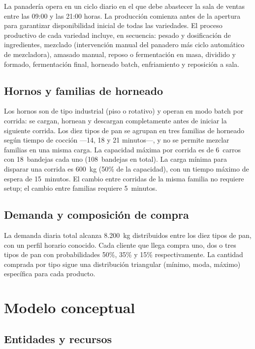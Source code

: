\documentclass[12pt]{article}
\begin{document}
La panadería opera en un ciclo diario en el que debe abastecer la sala de ventas entre las 09:00 y las 21:00 horas. La producción comienza antes de la apertura para garantizar disponibilidad inicial de todas las variedades. El proceso productivo de cada variedad incluye, en secuencia: pesado y dosificación de ingredientes, mezclado (intervención manual del panadero más ciclo automático de mezcladora), amasado manual, reposo o fermentación en masa, dividido y formado, fermentación final, horneado batch, enfriamiento y reposición a sala.

\subsection{Hornos y familias de horneado}

Los hornos son de tipo industrial (piso o rotativo) y operan en modo batch por corrida: se cargan, hornean y descargan completamente antes de iniciar la siguiente corrida. Los diez tipos de pan se agrupan en tres familias de horneado según tiempo de cocción ---14, 18 y 21 minutos---, y no se permite mezclar familias en una misma carga. La capacidad máxima por corrida es de 6~carros con 18~bandejas cada uno (108~bandejas en total). La carga mínima para disparar una corrida es 600~kg (50\% de la capacidad), con un tiempo máximo de espera de 15~minutos. El cambio entre corridas de la misma familia no requiere setup; el cambio entre familias requiere 5~minutos.

\subsection{Demanda y composición de compra}

La demanda diaria total alcanza 8.200~kg distribuidos entre los diez tipos de pan, con un perfil horario conocido. Cada cliente que llega compra uno, dos o tres tipos de pan con probabilidades 50\%, 35\% y 15\% respectivamente. La cantidad comprada por tipo sigue una distribución triangular (mínimo, moda, máximo) específica para cada producto.

\newpage
\section{Modelo conceptual}

\subsection{Entidades y recursos}
\end{document}
